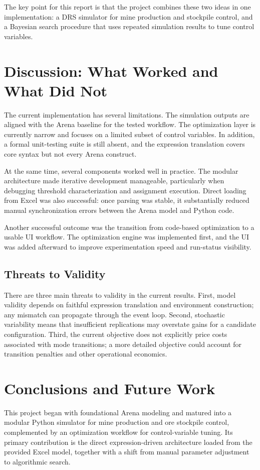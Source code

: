 \documentclass[11pt]{article}
\begin{document}
The key point for this report is that the project combines these two ideas in one implementation: a DRS simulator for mine production and stockpile control, and a Bayesian search procedure that uses repeated simulation results to tune control variables.

\section{Discussion: What Worked and What Did Not}
The current implementation has several limitations. The simulation outputs are aligned with the Arena baseline for the tested workflow. The optimization layer is currently narrow and focuses on a limited subset of control variables. In addition, a formal unit-testing suite is still absent, and the expression translation covers core syntax but not every Arena construct.

At the same time, several components worked well in practice. The modular architecture made iterative development manageable, particularly when debugging threshold characterization and assignment execution. Direct loading from Excel was also successful: once parsing was stable, it substantially reduced manual synchronization errors between the Arena model and Python code.

Another successful outcome was the transition from code-based optimization to a usable UI workflow. The optimization engine was implemented first, and the UI was added afterward to improve experimentation speed and run-status visibility.

\subsection{Threats to Validity}
There are three main threats to validity in the current results. First, model validity depends on faithful expression translation and environment construction; any mismatch can propagate through the event loop. Second, stochastic variability means that insufficient replications may overstate gains for a candidate configuration. Third, the current objective does not explicitly price costs associated with mode transitions; a more detailed objective could account for transition penalties and other operational economics.

\section{Conclusions and Future Work}
This project began with foundational Arena modeling and matured into a modular Python simulator for mine production and ore stockpile control, complemented by an optimization workflow for control-variable tuning. Its primary contribution is the direct expression-driven architecture loaded from the provided Excel model, together with a shift from manual parameter adjustment to algorithmic search.
\end{document}

